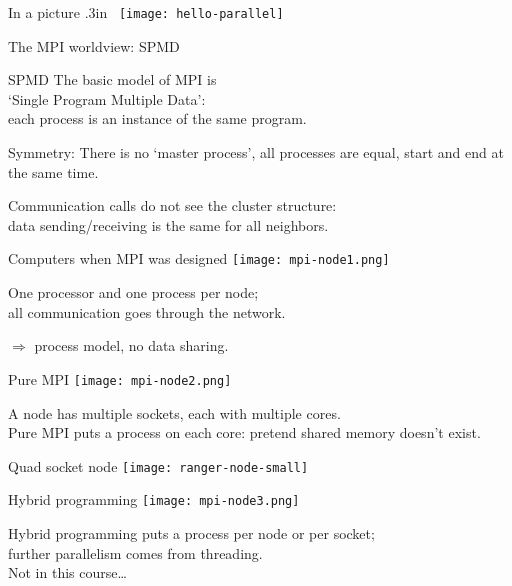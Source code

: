 \begin{numberedframe}{In a picture}
  \moveleft .3in \hbox\bgroup
  \texttt{[image: hello-parallel]}
  \egroup
\end{numberedframe}

 {The MPI worldview: SPMD}

\begin{numberedframe}{SPMD}
  The basic model of MPI is\\
  `Single Program Multiple Data':\\
  each process is an instance of the same program.

  Symmetry: There is no `master process', all processes are equal,
  start and end
  at the same time.

  Communication calls do not see the cluster structure:\\
  data sending/receiving is the same for all neighbors.
\end{numberedframe}

\begin{numberedframe}{Computers when MPI was designed}
  \texttt{[image: mpi-node1.png]}

  One processor and one  process per node;\\
  all communication goes through the network.

  $\Rightarrow$ process model, no data sharing.
\end{numberedframe}

\begin{numberedframe}{Pure MPI}
  \texttt{[image: mpi-node2.png]}

  A node has multiple sockets, each with multiple cores.\\
  Pure MPI puts a process on each core: pretend shared memory doesn't exist.
\end{numberedframe}

\begin{numberedframe}{Quad socket node}
  \texttt{[image: ranger-node-small]}
\end{numberedframe}

\begin{numberedframe}{Hybrid programming}
  \texttt{[image: mpi-node3.png]}

  Hybrid programming puts a process per node or per socket;\\
  further parallelism comes from threading.\\
  Not in this course\ldots
\end{numberedframe}

